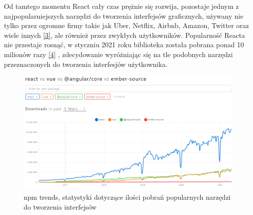 \documentclass[oneside,polski,logo,indent]{amuthesis}
\begin{document}
\begin{enumerate}
\begin{enumerate}
{Od tamtego momentu React cały czas prężnie się rozwija, pozostaje jednym z najpopularniejszych narzędzi do tworzenia interfejsów graficznych, używany nie tylko przez ogromne firmy takie jak Uber, Netflix, Airbnb, Amazon, Twitter oraz wiele innych \hyperlink{[3]}{[3]}, ale również przez zwykłych użytkowników. Popularność Reacta nie przestaje rosnąć, w styczniu 2021 roku biblioteka została pobrana ponad 10 milionów razy \hyperlink{[4]}{[4]} , zdecydowanie wyróżniając się na tle podobnych narzędzi przeznaczonych do tworzenia interfesjów użytkownika.

\begin{figure}
\centering
\includegraphics[width=14cm]{statystyki react vue angular.png}
\caption{npm trends, statystyki dotyczące ilości pobrań popularnych narzędzi do tworzenia interfejsów}
\label{statystyki react vue angular.png}
\end{figure}

}


\end{enumerate}
\end{enumerate}
\end{document}
